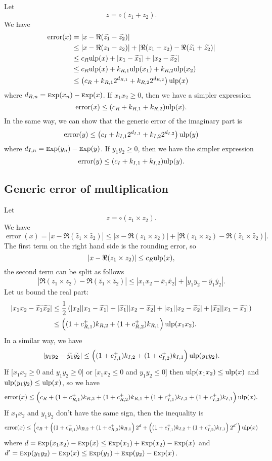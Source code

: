 \documentclass {article}
\DeclareMathOperator{\error}{error}
\newcommand {\Ulp}{{\rm ulp}}
\newcommand {\Exp}{{\rm \textsc exp}}
\begin{document}
Let
\[
z=\circ(z_1+z_2).
\]
We have
\begin{align*}
\error(x)&= |x-\Re(\widetilde{z_1}-\widetilde{z_2})|
\\
&\leq |x-\Re(z_1-z_2)|+|\Re(z_1+z_2)-\Re(\widetilde{z_1}+\widetilde{z_2})|
\\
&\leq c_R\Ulp(x)+|x_1-\widetilde{x_1}|+|x_2-\widetilde{x_2}|
\\
&\leq c_R\Ulp(x)+k_{R,1}\Ulp(x_1)+k_{R,2}\Ulp(x_2)
\\
&\leq \left(c_R+k_{R,1}2^{d_{R,1}}+k_{R,2}2^{d_{R,2}}\right)\Ulp(x)
\end{align*}
where $d_{R,n}=\Exp(x_n)-\Exp(x)$. If $x_1x_2 \geq 0$, then we have a simpler
expression
\[
\error(x) \leq (c_R+k_{R,1}+k_{R,2}) \Ulp(x).
\]
In the same way, we can show that the generic error of the imaginary part is
\[
\error (y) \leq \left(c_I+k_{I,1}2^{d_{I,1}}+k_{I,2}2^{d_{I,2}}\right) \Ulp(y)
\]
where $d_{I,n}=\Exp(y_n)-\Exp(y)$. If $y_1y_2 \geq 0$, then we have the
simpler expression
\[
\error(y) \leq (c_I+k_{I,1}+k_{I,2}) \Ulp(y).
\]


\subsection {Generic error of multiplication}

Let
\[
z=\circ(z_1\times z_2).
\]
We have
\[
\error(x) = |x-\Re(\widetilde{z_1}\times \widetilde{z_2})| \leq
|x-\Re(z_1\times z_2)|
+|\Re(z_1\times z_2)-\Re(\widetilde{z_1}\times\widetilde{z_2})|.
\]
The first term on the right hand side is the rounding error, so
\[
|x-\Re(z_1\times z_2)| \leq c_R \Ulp(x),
\]
the second term can be split as follows
\[
|\Re(z_1\times z_2)-\Re(\widetilde{z_1}\times\widetilde{z_2})| \leq
|x_1x_2-\widetilde{x_1}\widetilde{x_2}|
+|y_1y_2-\widetilde{y_1}\widetilde{y_2}|.
\]
Let us bound the real part:
\begin{align*}
|x_1x_2-\widetilde{x_1}\widetilde{x_2}| &\leq
\frac{1}{2}\left(|x_2||x_1-\widetilde{x_1}|
+|\widetilde{x_1}||x_2-\widetilde{x_2}|+|x_1||x_2-\widetilde{x_2}|
+|\widetilde{x_2}||x_1-\widetilde{x_1}|\right)
\\
&\leq \left((1+c_{R,1}^+)k_{R,2}+(1+c_{R,2}^+)k_{R,1}\right)\Ulp(x_1x_2).
\end{align*}
In a similar way, we have
\[
|y_1y_2-\widetilde{y_1}\widetilde{y_2}| \leq
\left((1+c_{I,1}^+)k_{I,2}+(1+c_{I,2}^+)k_{I,1}\right)\Ulp(y_1y_2).
\]
If [$x_1x_2 \geq 0$ and $y_1y_2 \geq 0$] or [$x_1x_2 \leq 0$ and $y_1y_2 \leq
  0$] then $\Ulp(x_1x_2) \leq \Ulp(x)$ and $\Ulp(y_1y_2) \leq \Ulp(x)$, so we
have
\[
\error(x) \leq \left(c_R + (1+c_{R,1}^+)k_{R,2} + (1+c_{R,2}^+)k_{R,1} +
(1+c_{I,1}^+)k_{I,2} + (1+c_{I,2}^+)k_{I,1} \right) \Ulp(x).
\]
If $x_1x_2$ and $y_1y_2$ don't have the same sign, then the inequality is
\[
\error(x) \leq \left( c_R + \left( (1+c_{R,1}^+)k_{R,2} + (1+c_{R,2}^+)k_{R,1}
\right)2^d + \left( (1+c_{I,1}^+)k_{I,2} + (1+c_{I,2}^+)k_{I,1} \right)2^{d'}
\right) \Ulp(x)
\]
where $d = \Exp(x_1x_2)-\Exp(x) \leq \Exp(x_1)+\Exp(x_2)-\Exp(x)$ and $d' =
\Exp(y_1y_2)-\Exp(x) \leq \Exp(y_1)+\Exp(y_2)-\Exp(x)$.
\end{document}
